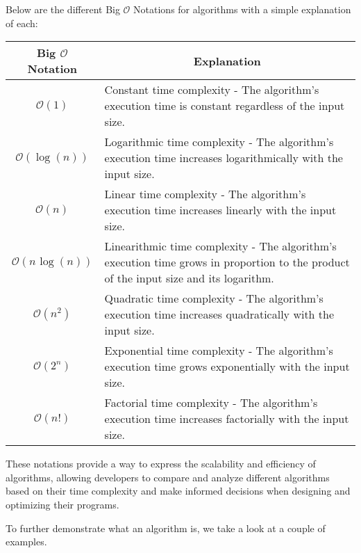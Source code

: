 \begin{solution}
    Below are the different Big $\mathcal{O}$ Notations for algorithms with a simple explanation of each: \\
    \begin{center}
        \begin{tabular}{|c|p{12cm}|}
            \hline \textbf{Big $\mathcal{O}$ Notation} & \multicolumn{1}{|c|}{\textbf{Explanation}} \\ \hline
            $\mathcal{O}(1)$ & Constant time complexity - The algorithm's execution time is constant regardless of the input size. \\ \hline
            $\mathcal{O}(\log{(n)})$ & Logarithmic time complexity - The algorithm's execution time increases logarithmically with the input size. \\ \hline
            $\mathcal{O}(n)$ & Linear time complexity - The algorithm's execution time increases linearly with the input size. \\ \hline
            $\mathcal{O}(n\hspace{1pt}\log{(n)})$ & Linearithmic time complexity - The algorithm's execution time grows in proportion to the product of the input size and its logarithm. \\ \hline
            $\mathcal{O}(n^{2})$ & Quadratic time complexity - The algorithm's execution time increases quadratically with the input size. \\ \hline
            $\mathcal{O}(2^{n})$ & Exponential time complexity - The algorithm's execution time grows exponentially with the input size. \\ \hline
            $\mathcal{O}(n!)$ & 	Factorial time complexity - The algorithm's execution time increases factorially with the input size. \\ \hline
        \end{tabular}
    \end{center}
    These notations provide a way to express the scalability and efficiency of algorithms, allowing developers to compare and analyze different algorithms based on their time complexity and make informed decisions when designing and optimizing their programs. \\
\end{solution}

To further demonstrate what an algorithm is, we take a look at a couple of examples. \\

